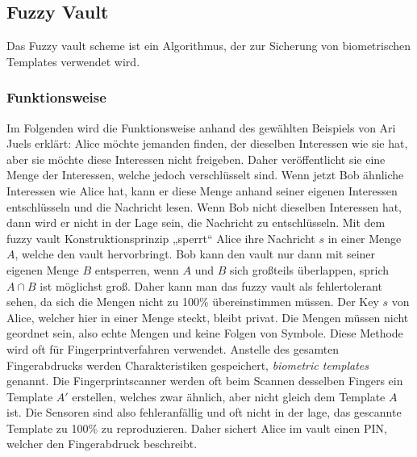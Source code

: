 \documentclass[12pt,a4paper]{article}
\begin{document}
\subsection{Fuzzy Vault}
Das Fuzzy vault scheme ist ein Algorithmus, der zur Sicherung von biometrischen Templates verwendet wird.
\subsubsection{Funktionsweise}
Im Folgenden wird die Funktionsweise anhand des gewählten Beispiels von Ari Juels erklärt: Alice möchte jemanden finden, der dieselben Interessen wie sie hat, aber sie möchte diese Interessen nicht freigeben. Daher veröffentlicht sie eine Menge der Interessen, welche jedoch verschlüsselt sind. Wenn jetzt Bob ähnliche Interessen wie Alice hat, kann er diese Menge anhand seiner eigenen Interessen entschlüsseln und die Nachricht lesen. Wenn Bob nicht dieselben Interessen hat, dann wird er nicht in der Lage sein, die Nachricht zu entschlüsseln. \newline
Mit dem fuzzy vault Konstruktionsprinzip „sperrt“ Alice ihre Nachricht $s$ in einer Menge $A$, welche den vault hervorbringt. Bob kann den vault nur dann mit seiner eigenen Menge $B$ entsperren, wenn $A$ und $B$ sich großteils überlappen, sprich $A\cap B$ ist möglichst groß. Daher kann man das fuzzy vault als fehlertolerant sehen, da sich die Mengen nicht zu 100\% übereinstimmen müssen. Der Key $s$ von Alice, welcher hier in einer Menge steckt, bleibt privat.
\newline
Die Mengen müssen nicht geordnet sein, also echte Mengen und keine Folgen von Symbole.
\newline
Diese Methode wird oft für Fingerprintverfahren verwendet. Anstelle des gesamten Fingerabdrucks werden Charakteristiken gespeichert, \textit{biometric templates} genannt.
Die Fingerprintscanner werden oft beim Scannen desselben Fingers ein Template $A'$ erstellen, welches zwar ähnlich, aber nicht gleich dem Template $A$ ist. Die Sensoren sind also fehleranfällig und oft nicht in der lage, das gescannte Template zu 100\% zu reproduzieren. Daher sichert Alice im vault einen PIN, welcher den Fingerabdruck beschreibt.
\end{document}

